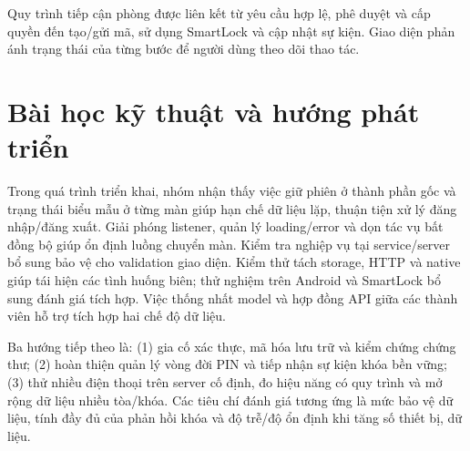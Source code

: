 Quy trình tiếp cận phòng được liên kết từ yêu cầu hợp lệ, phê duyệt và cấp quyền đến tạo/gửi mã, sử dụng SmartLock và cập nhật sự kiện. Giao diện phản ánh trạng thái của từng bước để người dùng theo dõi thao tác.

\section{Bài học kỹ thuật và hướng phát triển}
Trong quá trình triển khai, nhóm nhận thấy việc giữ phiên ở thành phần gốc và trạng thái biểu mẫu ở từng màn giúp hạn chế dữ liệu lặp, thuận tiện xử lý đăng nhập/đăng xuất. Giải phóng listener, quản lý loading/error và dọn tác vụ bất đồng bộ giúp ổn định luồng chuyển màn. Kiểm tra nghiệp vụ tại service/server bổ sung bảo vệ cho validation giao diện. Kiểm thử tách storage, HTTP và native giúp tái hiện các tình huống biên; thử nghiệm trên Android và SmartLock bổ sung đánh giá tích hợp. Việc thống nhất model và hợp đồng API giữa các thành viên hỗ trợ tích hợp hai chế độ dữ liệu.

Ba hướng tiếp theo là: (1) gia cố xác thực, mã hóa lưu trữ và kiểm chứng chứng thư; (2) hoàn thiện quản lý vòng đời PIN và tiếp nhận sự kiện khóa bền vững; (3) thử nhiều điện thoại trên server cố định, đo hiệu năng có quy trình và mở rộng dữ liệu nhiều tòa/khóa. Các tiêu chí đánh giá tương ứng là mức bảo vệ dữ liệu, tính đầy đủ của phản hồi khóa và độ trễ/độ ổn định khi tăng số thiết bị, dữ liệu.
